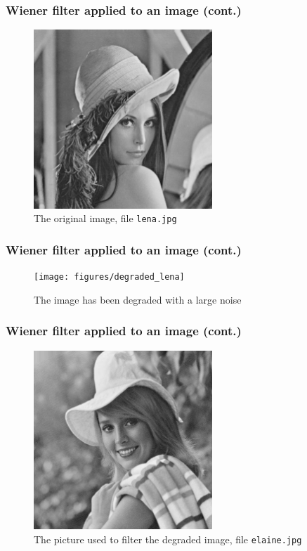\documentclass[10pt]{beamer}
\begin{document}
\begin{frame}
  \frametitle{Wiener filter applied to an image (cont.)}
  \begin{figure}
    \centering
    \vspace{-0.5em}
    \includegraphics[width=0.6\textwidth]{lena}
    \caption{The original image, file \texttt{lena.jpg}}
    \vspace{-1em}
  \end{figure}
\end{frame}

\begin{frame}
  \frametitle{Wiener filter applied to an image (cont.)}
  \begin{figure}
    \centering
    \vspace{-0.5em}
    \texttt{[image: figures/degraded\_lena]}
    \caption{The image has been degraded with a large noise}
    \vspace{-1em}
  \end{figure}
\end{frame}

\begin{frame}
  \frametitle{Wiener filter applied to an image (cont.)}
  \begin{figure}
    \centering
    \vspace{-0.5em}
    \includegraphics[width=0.6\textwidth]{elaine}
    \caption{The picture used to filter the degraded image, file
      \texttt{elaine.jpg}}
    \vspace{-1em}
  \end{figure}
\end{frame}
\end{document}
